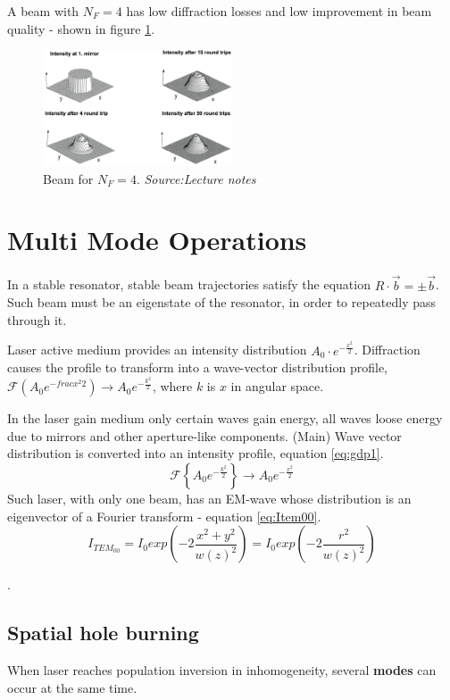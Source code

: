 A beam with $N_F=4$ has low diffraction losses and low improvement in beam quality - shown in figure \ref{fig:fbq2}.
\begin{figure}[h!]
    \centering
    \includegraphics[width=0.5\textwidth]{slike/fbq4.png}
    \caption{Beam for $N_F=4$. \textit{Source:Lecture notes}}
    \label{fig:fbq2}
\end{figure}

\section{Multi Mode Operations}

In a stable resonator, stable beam trajectories satisfy the equation $R \cdot \vec{b} = \pm\vec{b}$.
Such beam must be an eigenstate of the resonator, in order to repeatedly pass through it. 

Laser active medium provides an intensity distribution $A_0 \cdot e^{-\frac{x^2}{2}}$.
Diffraction causes the profile to transform into a wave-vector distribution profile,
$\mathcal{F}(A_0 e^{-frac{x^2}{2}}) \rightarrow A_0 e^{-\frac{k^2}{2}}$, where $k$ is $x$ in angular space.

In the laser gain medium only certain waves gain energy, all waves loose energy due to
mirrors and other aperture-like components. (Main) Wave vector distribution is converted into
an intensity profile, equation \ref{eq:gdp1}.
\begin{equation}
    \mathcal{F} \left\{ A_0 e^{-\frac{k^2}{2}}\right\} \rightarrow A_0 e^{-\frac{x^2}{2}}
    \label{eq:gdp1}
\end{equation}
Such laser, with only one beam, has an EM-wave whose distribution is an eigenvector of a Fourier transform - equation \ref{eq:Item00}.
\begin{equation}
    I_{TEM_{00}} = I_0 exp \left( -2\frac{x^2+y^2}{w(z)^2}\right) = I_0 exp\left( -2 \frac{r^2}{w(z)^2} \right)
    \label{eq:Item00}
\end{equation}

.

\subsection{Spatial hole burning}
When laser reaches population inversion in inhomogeneity, several \textbf{modes} can occur at the same time.

